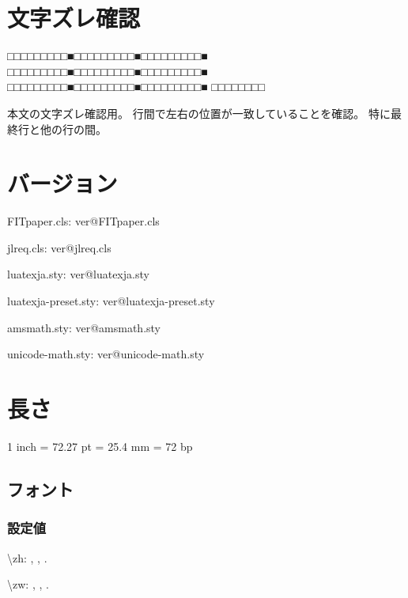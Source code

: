 \documentclass{FITpaper}
\begin{document}
\maketitle

\section{文字ズレ確認}

□□□□□□□□□■□□□□□□□□□■□□□□□□□□□■
□□□□□□□□□■□□□□□□□□□■□□□□□□□□□■
□□□□□□□□□■□□□□□□□□□■□□□□□□□□□■
□□□□□□□□

本文の文字ズレ確認用。
行間で左右の位置が一致していることを確認。
特に最終行と他の行の間。

\section{バージョン}

\makeatletter
FITpaper.cls: \csname ver@FITpaper.cls\endcsname\par
jlreq.cls: \csname ver@jlreq.cls\endcsname\par
luatexja.sty: \csname ver@luatexja.sty\endcsname\par
luatexja-preset.sty: \csname ver@luatexja-preset.sty\endcsname\par
amsmath.sty: \csname ver@amsmath.sty\endcsname\par
unicode-math.sty: \csname ver@unicode-math.sty\endcsname\par
\makeatother

\section{長さ}

1 inch = 72.27 pt = 25.4 mm = 72 bp

\subsection{フォント}

\subsubsection{設定値}

\textbackslash zh:
\prntlen{\zh},
\prntlen{\zh},
\prntlen{\zh}.

\textbackslash zw:
\prntlen{\zw},
\prntlen{\zw},
\prntlen{\zw}.
\end{document}
